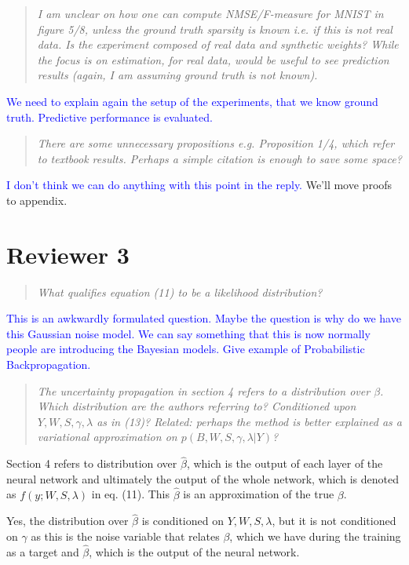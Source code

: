 \documentclass{article}
\begin{document}
\begin{quote}
\textit{I am unclear on how one can compute NMSE/F-measure for MNIST in figure 5/8, unless the ground truth sparsity is known i.e. if this is not real data. Is the experiment composed of real data and synthetic weights? While the focus is on estimation, for real data, would be useful to see prediction results (again, I am assuming ground truth is not known).}
\end{quote}
\textcolor{blue}{We need to explain again the setup of the experiments, that we know ground truth. Predictive performance is evaluated.}

\begin{quote}
\textit{There are some unnecessary propositions e.g. Proposition 1/4, which refer to textbook results. Perhaps a simple citation is enough to save some space?}
\end{quote}
\textcolor{blue}{I don't think we can do anything with this point in the reply.} We'll move proofs to appendix.

\section*{Reviewer 3}
\begin{quote}
\textit{What qualifies equation (11) to be a likelihood distribution?}
\end{quote}
\textcolor{blue}{This is an awkwardly formulated question. Maybe the question is why do we have this Gaussian noise model. We can say something that this is now normally people are introducing the Bayesian models. Give example of Probabilistic Backpropagation.}

\begin{quote}
\textit{The uncertainty propagation in section 4 refers to a distribution over $\beta$. Which distribution are the authors referring to? Conditioned upon $Y,W,S,\gamma,\lambda$ as in (13)? Related: perhaps the method is better explained as a variational approximation on $p(B,W,S,\gamma,\lambda|Y)$?}
\end{quote}
Section 4 refers to distribution over $\widehat{\beta}$, which is the output of each layer of the neural network and ultimately the output of the whole network, which is denoted as $f(y; W, S, \lambda)$ in eq. (11). This $\widehat{\beta}$ is an approximation of the true $\beta$.

Yes, the distribution over $\widehat{\beta}$ is conditioned on $Y, W, S, \lambda$, but it is not conditioned on $\gamma$ as this is the noise variable that relates $\beta$, which we have during the training as a target and $\widehat{\beta}$, which is the output of the neural network.
\end{document}
